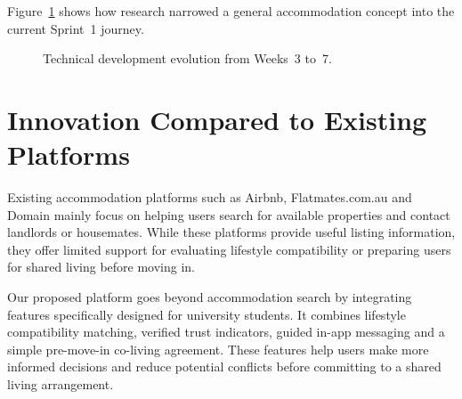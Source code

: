 \documentclass[11pt,a4paper]{article}
\begin{document}
Figure~\ref{figdevevolution} shows how research narrowed a general accommodation concept into the current Sprint~1 journey.

\begin{figure}[H]
    \centering
    \caption{Technical development evolution from Weeks~3 to~7.}
    \label{figdevevolution}
\end{figure}

\section{Innovation Compared to Existing Platforms}
\label{secinnovation}

Existing accommodation platforms such as Airbnb, Flatmates.com.au and Domain mainly focus on helping users search for available properties and contact landlords or housemates. While these platforms provide useful listing information, they offer limited support for evaluating lifestyle compatibility or preparing users for shared living before moving in.

Our proposed platform goes beyond accommodation search by integrating features specifically designed for university students. It combines lifestyle compatibility matching, verified trust indicators, guided in-app messaging and a simple pre-move-in co-living agreement. These features help users make more informed decisions and reduce potential conflicts before committing to a shared living arrangement.
\end{document}

